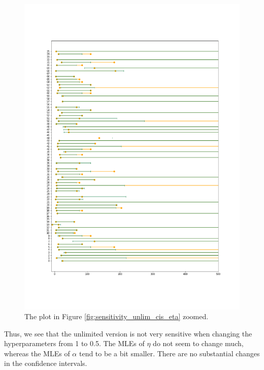 \begin{figure}
    \centering
    \includegraphics[scale=0.36]{pictures/Sensitivity/ci_unlim_eta_zoomed.png}
    \caption[CIs for $\eta$, unlimited. Zoomed]{The plot in Figure \ref{fig:sensitivity_unlim_cis_eta} zoomed.}
    \label{fig:sensitivity_unlim_cis_eta_zoomed}
\end{figure}

Thus, we see that the unlimited version is not very sensitive when changing the hyperparameters from 1 to 0.5. The MLEs of $\eta$ do not seem to change much, whereas the MLEs of $\alpha$ tend to be a bit smaller. There are no substantial changes in the confidence intervals. 




